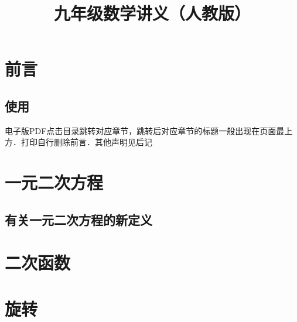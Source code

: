 \documentclass[lang=cn, 10pt, titlestyle=display, oneside, toc=twocol]{elegantbook}
\title{九年级数学讲义（人教版）}
\begin{document}
\chapter*{前言}

\section*{使用}

电子版PDF点击目录跳转对应章节，跳转后对应章节的标题一般出现在页面最上方．打印自行删除前言．其他声明见后记




\tableofcontents



\chapter{一元二次方程}










\section{有关一元二次方程的新定义}



\chapter{二次函数}









\chapter{旋转}
\end{document}
